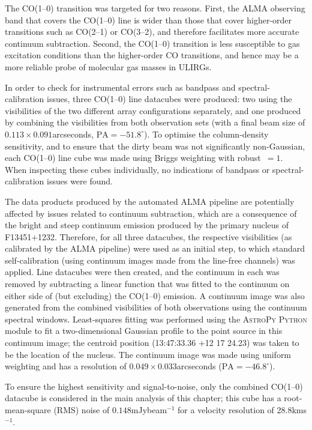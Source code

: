 The CO(1--0) transition was targeted for two reasons. First, the ALMA observing band that covers the CO(1--0) line is wider than those that cover higher-order transitions such as CO(2--1) or CO(3--2), and therefore facilitates more accurate continuum subtraction. Second, the CO(1--0) transition is less susceptible to gas excitation conditions than the higher-order CO transitions, and hence may be a more reliable probe of molecular gas masses in ULIRGs.

In order to check for instrumental errors such as bandpass and spectral-calibration issues, three CO(1--0) line datacubes were produced: two using the visibilities of the two different array configurations separately, and one produced by combining the visibilities from both observation sets (with a final beam size of $0.113\times0.091$\;arcseconds, $\mathrm{PA}=-51.8^\circ$). To optimise the column-density sensitivity, and to ensure that the dirty beam was not significantly non-Gaussian, each CO(1--0) line cube was made using Briggs weighting with \mbox{robust $=1$}. When inspecting these cubes individually, no indications of bandpass or spectral-calibration issues were found.

The data products produced by the automated ALMA pipeline are potentially affected by issues related to continuum subtraction, which are a consequence of the bright and steep continuum emission produced by the primary nucleus of F13451+1232. Therefore, for all three datacubes, the respective visibilities (as calibrated by the ALMA pipeline) were used as an initial step, to which standard self-calibration (using continuum images made from the line-free channels) was applied. Line datacubes were then created, and the continuum in each was removed by subtracting a linear function that was fitted to the continuum on either side of (but excluding) the CO(1--0) emission. A continuum image was also generated from the combined visibilities of both observations using the continuum spectral windows. Least-squares fitting was performed using the \textsc{AstroPy} \citep{AstropyCollaboration2013, AstropyCollaboration2018} \textsc{Python} module to fit a two-dimensional Gaussian profile to the point source in this continuum image; the centroid position (13:47:33.36 +12 17 24.23) was taken to be the location of the nucleus. The continuum image was made using uniform weighting and has a resolution of $0.049\times0.033$\;arcseconds ($\mathrm{PA}=-46.8^\circ$).

To ensure the highest sensitivity and signal-to-noise, only the combined CO(1--0) datacube is considered in the main analysis of this chapter; this cube has a root-mean-square (RMS) noise of $0.148$\;mJy\;beam$^{-1}$ for a velocity resolution of 28.8\;km\;s$^{-1}$.

